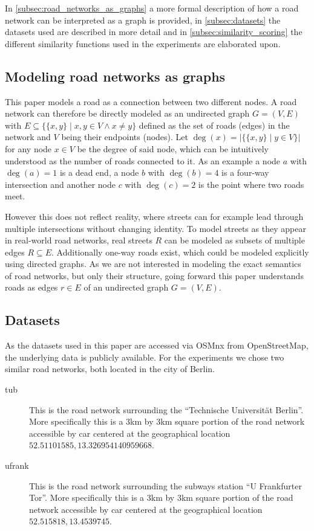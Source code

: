 \documentclass[12pt,a4paper]{IEEEtran}
\begin{document}
In \autoref{subsec:road_networks_as_graphs} a more formal description
of how a road network can be interpreted as a graph is provided,
in \autoref{subsec:datasets} the datasets used are described in more detail and
in \autoref{subsec:similarity_scoring} the different similarity functions
used in the experiments are elaborated upon.

\subsection{Modeling road networks as graphs}\label{subsec:road_networks_as_graphs}

This paper models a road as a connection between two different nodes.
A road network can therefore be directly modeled as an undirected graph \(G = (V, E)\) with
\(E \subseteq \{\{x, y\} \mid x, y \in V \wedge x \neq y\}\) defined as the set of roads (edges) in the network
and \(V\) being their endpoints (nodes).
Let \(\deg(x) = |\{\{x, y\} \mid y \in V\}|\) for any node \(x \in V\) be the degree of said node,
which can be intuitively understood as the number of roads connected to it.
As an example a node \(a\) with \(\deg(a) = 1\) is a dead end,
a node \(b\) with \(\deg(b) = 4\) is a four-way intersection and
another node \(c\) with \(\deg(c) = 2\) is the point where two roads meet.

However this does not reflect reality, where streets can for example lead through
multiple intersections without changing identity.
To model streets as they appear in real-world road networks,
real streets \(R\) can be modeled as subsets of multiple edges \(R \subseteq E\).
Additionally one-way roads exist, which could be modeled explicitly using directed graphs.
As we are not interested in modeling the exact semantics of road networks,
but only their structure, going forward this paper understands roads as
edges \(r \in E\) of an undirected graph \(G = (V, E)\).

\subsection{Datasets}\label{subsec:datasets}

As the datasets used in this paper are accessed via OSMnx from OpenStreetMap,
the underlying data is publicly available.
For the experiments we chose two similar road networks,
both located in the city of Berlin.

\begin{description}
\item[tub] This is the road network surrounding the
      \enquote{\foreignlanguage{ngerman}{Technische Universität Berlin}}.
      More specifically this is a 3km by 3km square portion of the road network accessible
      by car centered at the geographical location \(52.51101585, 13.326954140959668\).
\item[ufrank] This is the road network surrounding the subways station
      \enquote{\foreignlanguage{ngerman}{U Frankfurter Tor}}.
      More specifically this is a 3km by 3km square portion of the road network accessible
      by car centered at the geographical location \(52.515818, 13.4539745\).
\end{description}
\end{document}

